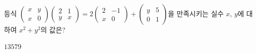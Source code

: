 \hspace*{2mm}\begin{minipage}[t]{\dimexpr\linewidth-2mm\relax}\vspace{0pt}
등식 $\begin{pmatrix} x & y \\ x & 0 \end{pmatrix}\begin{pmatrix} 2 & 1 \\ y & x \end{pmatrix}=2\begin{pmatrix} 2 & -1 \\ x & 0 \end{pmatrix}+\begin{pmatrix} y & 5 \\ 0 & 1 \end{pmatrix}$을 만족시키는 실수 $x$, $y$에 대하여 $x^2+y^2$의 값은?
\begin{choices32}{$1$}{$3$}{$5$}{$7$}{$9$}\end{choices32}\end{minipage}
